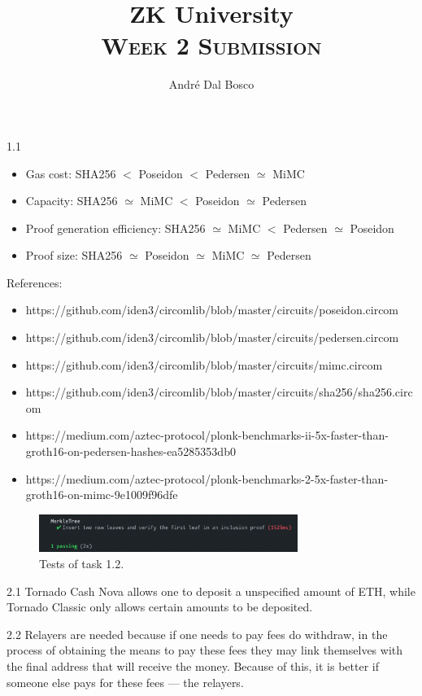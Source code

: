 \documentclass{article}
\title{ZK University \\[4pt] \normalsize\textsc{Week 2 Submission}}
\author{André Dal Bosco \\ \small{\email \quad \discord}}
\begin{document}
\maketitle

1.1 \begin{itemize}
    \item Gas cost: SHA256 $<$ Poseidon $<$ Pedersen $\simeq$ MiMC
    \item Capacity: SHA256 $\simeq$ MiMC $<$ Poseidon $\simeq$ Pedersen
    \item Proof generation efficiency: SHA256 $\simeq$ MiMC $<$ Pedersen $\simeq$ Poseidon
    \item Proof size: SHA256 $\simeq$ Poseidon $\simeq$ MiMC $\simeq$ Pedersen
\end{itemize}

References: \begin{itemize}
    \item https://github.com/iden3/circomlib/blob/master/circuits/poseidon.circom
    \item https://github.com/iden3/circomlib/blob/master/circuits/pedersen.circom
    \item https://github.com/iden3/circomlib/blob/master/circuits/mimc.circom
    \item https://github.com/iden3/circomlib/blob/master/circuits/sha256/sha256.circom
    \item https://medium.com/aztec-protocol/plonk-benchmarks-ii-5x-faster-than-groth16-on-pedersen-hashes-ea5285353db0
    \item https://medium.com/aztec-protocol/plonk-benchmarks-2-5x-faster-than-groth16-on-mimc-9e1009f96dfe
\end{itemize}

\begin{figure}[h]
    \centering
    \includegraphics[width=0.75\textwidth]{img1.png}
    \caption*{Tests of task 1.2.}
\end{figure}


2.1 Tornado Cash Nova allows one to deposit a unspecified amount of ETH, while Tornado Classic only allows certain amounts to be deposited.

2.2 Relayers are needed because if one needs to pay fees do withdraw, in the process of obtaining the means to pay these fees they may link themselves with the final address that will receive the money. Because of this, it is better if someone else pays for these fees --- the relayers.
\end{document}
